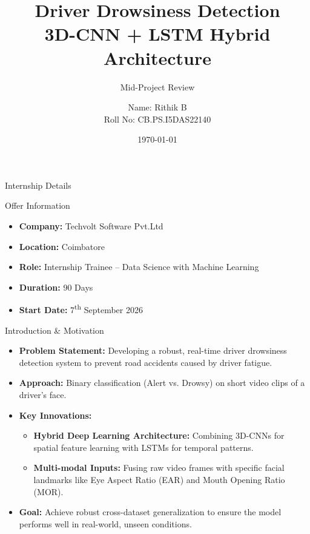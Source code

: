 \documentclass{beamer}
\title[Drowsiness Detection]{Driver Drowsiness Detection \\ \large 3D-CNN + LSTM Hybrid Architecture}
\subtitle{Mid-Project Review}
\author[Rithik B]{Name: Rithik B \\ Roll No: CB.PS.I5DAS22140}
\institute{Amrita Vishwa Vidyapeetham}
\date{\today}
\begin{document}
\begin{frame}
    \titlepage
\end{frame}

\begin{frame}{Internship Details}
    \vspace{0.5cm}
    \begin{block}{Offer Information}
        \vspace{0.3cm}
        \begin{itemize}
            \setlength\itemsep{1.2em}
            \item \textbf{Company:} Techvolt Software Pvt.Ltd
            \item \textbf{Location:} Coimbatore
            \item \textbf{Role:} Internship Trainee -- Data Science with Machine Learning
            \item \textbf{Duration:} 90 Days
            \item \textbf{Start Date:} 7\textsuperscript{th} September 2026
        \end{itemize}
        \vspace{0.3cm}
    \end{block}
\end{frame}

\begin{frame}{Introduction \& Motivation}
    \begin{itemize}
        \item \textbf{Problem Statement:} Developing a robust, real-time driver drowsiness detection system to prevent road accidents caused by driver fatigue.
        \item \textbf{Approach:} Binary classification (Alert vs. Drowsy) on short video clips of a driver's face.
        \item \textbf{Key Innovations:}
        \begin{itemize}
            \item \textbf{Hybrid Deep Learning Architecture:} Combining 3D-CNNs for spatial feature learning with LSTMs for temporal patterns.
            \item \textbf{Multi-modal Inputs:} Fusing raw video frames with specific facial landmarks like Eye Aspect Ratio (EAR) and Mouth Opening Ratio (MOR).
        \end{itemize}
        \item \textbf{Goal:} Achieve robust cross-dataset generalization to ensure the model performs well in real-world, unseen conditions.
    \end{itemize}
\end{frame}
\end{document}
